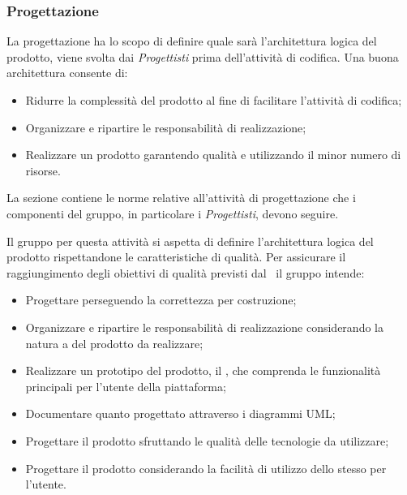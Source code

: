 \subsubsection{Progettazione}
 \label{PS_Progettazione_Scopo}La progettazione ha lo scopo di definire quale sarà l'architettura logica del prodotto, viene svolta dai \textit{Progettisti} prima dell'attività di codifica. Una buona architettura consente di:
\begin{itemize}
	\item Ridurre la complessità del prodotto al fine di facilitare l'attività di codifica;
	\item Organizzare e ripartire le responsabilità di realizzazione;
	\item Realizzare un prodotto garantendo qualità e utilizzando il minor numero di risorse.
\end{itemize} 

La sezione contiene le norme relative all'attività di progettazione che i componenti del gruppo, in particolare i \textit{Progettisti}, devono seguire.

\label{AspettativeProgettazione}Il gruppo per questa attività si aspetta di definire l'architettura logica del prodotto rispettandone le caratteristiche di qualità. Per assicurare il raggiungimento degli obiettivi di qualità previsti dal \PdQ\ il gruppo intende:
\begin{itemize}
	\item Progettare perseguendo la correttezza per costruzione;
	\item Organizzare e ripartire le responsabilità di realizzazione considerando la natura a  del prodotto da realizzare;
	\item Realizzare un prototipo del prodotto, il , che comprenda le funzionalità principali per l'utente della piattaforma;
	\item Documentare quanto progettato attraverso i diagrammi UML;
	\item Progettare il prodotto sfruttando le qualità delle tecnologie da utilizzare;
	\item Progettare il prodotto considerando la facilità di utilizzo dello stesso per l'utente.
\end{itemize}

